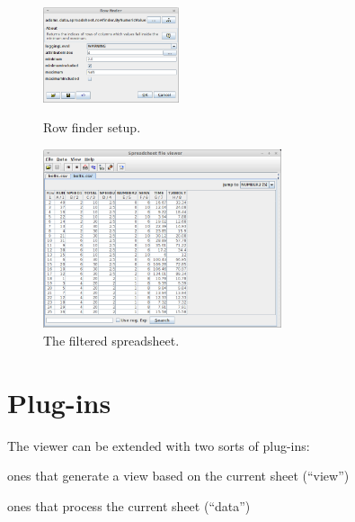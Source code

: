\documentclass[a4paper]{book}
\begin{document}
\begin{figure}[ht]
  \begin{minipage}[t]{0.4\linewidth}
    \centering
    \includegraphics[width=4.0cm]{images/spreadsheet-viewer-rowfilter_setup.png}
    \caption{Row finder setup.}
    \label{spreadsheet-viewer-rowfilter_setup}
  \end{minipage}
  \hspace{0.5cm}
  \begin{minipage}[t]{0.6\linewidth}
    \centering
    \includegraphics[width=7.0cm]{images/spreadsheet-viewer-rowfilter_result.png}
    \caption{The filtered spreadsheet.}
    \label{spreadsheet-viewer-rowfilter_result}
  \end{minipage}
\end{figure}

\section{Plug-ins}
The viewer can be extended with two sorts of plug-ins:
\begin{tight_itemize}
	\item ones that generate a view based on the current sheet (``view'')
	\item ones that process the current sheet (``data'')
\end{tight_itemize}
\end{document}

